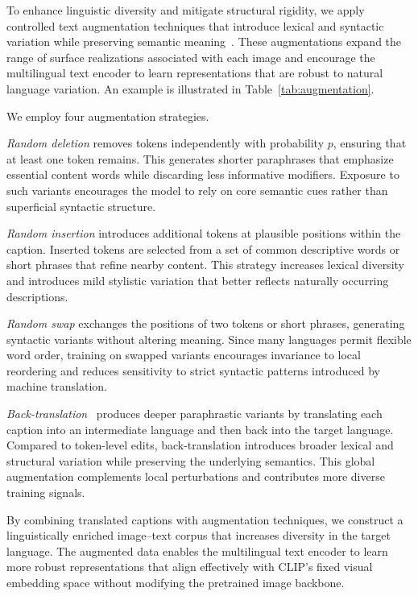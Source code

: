To enhance linguistic diversity and mitigate structural rigidity, we apply controlled text augmentation techniques that introduce lexical and syntactic variation while preserving semantic meaning~\cite{shorten2021text, wei2019eda}. These augmentations expand the range of surface realizations associated with each image and encourage the multilingual text encoder to learn representations that are robust to natural language variation. An example is illustrated in Table~\ref{tab:augmentation}.

We employ four augmentation strategies.

\textit{Random deletion} removes tokens independently with probability $p$, ensuring that at least one token remains. This generates shorter paraphrases that emphasize essential content words while discarding less informative modifiers. Exposure to such variants encourages the model to rely on core semantic cues rather than superficial syntactic structure.

\textit{Random insertion} introduces additional tokens at plausible positions within the caption. Inserted tokens are selected from a set of common descriptive words or short phrases that refine nearby content. This strategy increases lexical diversity and introduces mild stylistic variation that better reflects naturally occurring descriptions.

\textit{Random swap} exchanges the positions of two tokens or short phrases, generating syntactic variants without altering meaning. Since many languages permit flexible word order, training on swapped variants encourages invariance to local reordering and reduces sensitivity to strict syntactic patterns introduced by machine translation.

\textit{Back-translation}~\cite{corbeil2020bet} produces deeper paraphrastic variants by translating each caption into an intermediate language and then back into the target language. Compared to token-level edits, back-translation introduces broader lexical and structural variation while preserving the underlying semantics. This global augmentation complements local perturbations and contributes more diverse training signals.

By combining translated captions with augmentation techniques, we construct a linguistically enriched image–text corpus that increases diversity in the target language. The augmented data enables the multilingual text encoder to learn more robust representations that align effectively with CLIP’s fixed visual embedding space without modifying the pretrained image backbone.

